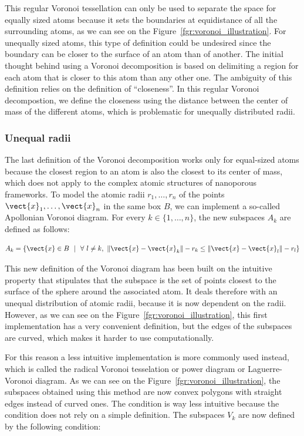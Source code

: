 \documentclass[main]{subfiles}
\begin{document}
This regular Voronoi tessellation can only be used to separate the space for equally sized atoms because it sets the boundaries at equidistance of all the surrounding atoms, as we can see on the Figure~\ref{fgr:voronoi_illustration}. For unequally sized atoms, this type of definition could be undesired since the boundary can be closer to the surface of an atom than of another. The initial thought behind using a Voronoi decomposition is based on delimiting a region for each atom that is closer to this atom than any other one. The ambiguity of this definition relies on the definition of ``closeness''. In this regular Voronoi decompostion, we define the closeness using the distance between the center of mass of the different atoms, which is problematic for unequally distributed radii.

\subsubsection{Unequal radii}

The last definition of the Voronoi decomposition works only for equal-sized atoms because the closest region to an atom is also the closest to its center of mass, which does not apply to the complex atomic structures of nanoporous frameworks. To model the atomic radii $r_1,\ldots,r_n$ of the points $\vect{x}_1,\ldots,\vect{x}_n$ in the same box $B$, we can implement a so-called Apollonian Voronoi diagram.\cite{voronoi_apollonian} For every $k\in\{1,\ldots,n\}$, the new subspaces $A_{k}$ are defined as follows:

\begin{equation}\label{eq:r_voronoi_apollonian}
  A_{k} = \left\{\vect{x} \in B\ \ |\ \ \forall\ l\neq k,\ \lVert \vect{x}-\vect{x}_k \rVert - r_k \leq \lVert \vect{x}-\vect{x}_l \rVert - r_l \right\}
\end{equation}

This new definition of the Voronoi diagram has been built on the intuitive property that stipulates that the subspace is the set of points closest to the surface of the sphere around the associated atom. It deals therefore with an unequal distribution of atomic radii, because it is now dependent on the radii. However, as we can see on the Figure~\ref{fgr:voronoi_illustration}, this first implementation has a very convenient definition, but the edges of the subspaces are curved, which makes it harder to use computationally. 

For this reason a less intuitive implementation is more commonly used instead, which is called the radical Voronoi tesselation or power diagram or Laguerre-Voronoi diagram.\cite{aurenhammer_1987} As we can see on the Figure~\ref{fgr:voronoi_illustration}, the subspaces obtained using this method are now convex polygons with straight edges instead of curved ones. The condition is way less intuitive because the condition does not rely on a simple definition. The subspaces $V_k$ are now defined by the following condition:
\end{document}
